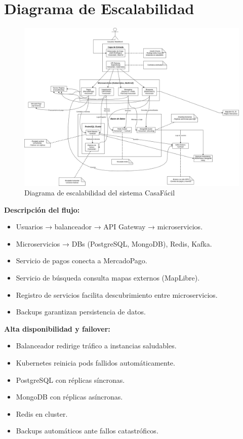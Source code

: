 \section{Diagrama de Escalabilidad}
	\begin{figure}[H]
		\centering
		\includegraphics[width=\textwidth]{figures/diagrams/Diagrama de escalabilidad.png}
		\caption{Diagrama de escalabilidad del sistema CasaFácil}
	\end{figure}
	
	\textbf{Descripción del flujo:}
	\begin{itemize}
		\item Usuarios → balanceador → API Gateway → microservicios.
		\item Microservicios → DBs (PostgreSQL, MongoDB), Redis, Kafka.
		\item Servicio de pagos conecta a MercadoPago.
		\item Servicio de búsqueda consulta mapas externos (MapLibre).
		\item Registro de servicios facilita descubrimiento entre microservicios.
		\item Backups garantizan persistencia de datos.
	\end{itemize}
	
	\newpage
	\textbf{Alta disponibilidad y failover:}
	\begin{itemize}
		\item Balanceador redirige tráfico a instancias saludables.
		\item Kubernetes reinicia pods fallidos automáticamente.
		\item PostgreSQL con réplicas síncronas.
		\item MongoDB con réplicas asíncronas.
		\item Redis en cluster.
		\item Backups automáticos ante fallos catastróficos.
	\end{itemize}
	
